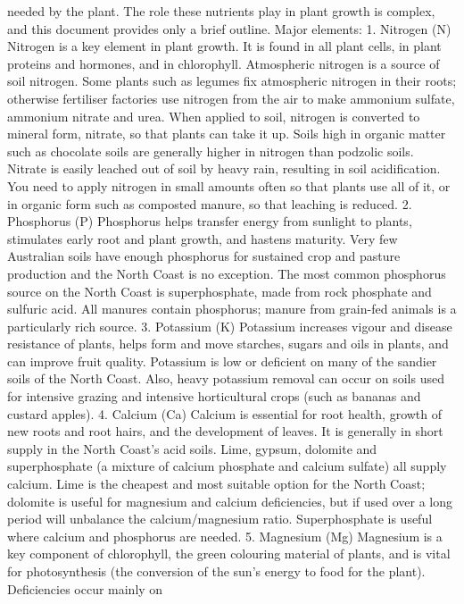 needed by the plant. The role these nutrients play in plant growth is
complex, and this document provides only a brief outline.
Major elements:
1. Nitrogen (N)
Nitrogen is a key element in plant growth. It is found in all plant
cells, in plant proteins and hormones, and in chlorophyll.
Atmospheric nitrogen is a source of soil nitrogen. Some plants such
as legumes fix atmospheric nitrogen in their roots; otherwise
fertiliser factories use nitrogen from the air to make ammonium
sulfate, ammonium nitrate and urea. When applied to soil, nitrogen is
converted to mineral form, nitrate, so that plants can take it up.
Soils high in organic matter such as chocolate soils are generally
higher in nitrogen than podzolic soils. Nitrate is easily leached out of
soil by heavy rain, resulting in soil acidification. You need to apply
nitrogen in small amounts often so that plants use all of it, or in
organic form such as composted manure, so that leaching is reduced.
2. Phosphorus (P)
Phosphorus helps transfer energy from sunlight to plants, stimulates
early root and plant growth, and hastens maturity.
Very few Australian soils have enough phosphorus for sustained crop
and pasture production and the North Coast is no exception. The
most common phosphorus source on the North Coast is
superphosphate, made from rock phosphate and sulfuric acid. All
manures contain phosphorus; manure from grain-fed animals is a
particularly rich source.
3. Potassium (K)
Potassium increases vigour and disease resistance of plants, helps
form and move starches, sugars and oils in plants, and can improve
fruit quality.
Potassium is low or deficient on many of the sandier soils of the
North Coast. Also, heavy potassium removal can occur on soils used
for intensive grazing and intensive horticultural crops (such as
bananas and custard apples).
4. Calcium (Ca)
Calcium is essential for root health, growth of new roots and root
hairs, and the development of leaves. It is generally in short supply
in the North Coast's acid soils. Lime, gypsum, dolomite and
superphosphate (a mixture of calcium phosphate and calcium sulfate)
all supply calcium. Lime is the cheapest and most suitable option for
the North Coast; dolomite is useful for magnesium and calcium
deficiencies, but if used over a long period will unbalance the
calcium/magnesium ratio. Superphosphate is useful where calcium
and phosphorus are needed.
5. Magnesium (Mg)
Magnesium is a key component of chlorophyll, the green colouring
material of plants, and is vital for photosynthesis (the conversion of
the sun's energy to food for the plant). Deficiencies occur mainly on
